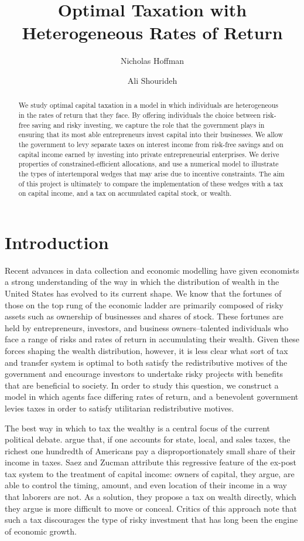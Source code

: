 \documentclass[11pt]{article}
\title{Optimal Taxation with Heterogeneous Rates of Return}
\author{
    Nicholas Hoffman\\
    \and 
    Ali Shourideh\\
}
\begin{document}
\maketitle
\begin{abstract}
    We study optimal capital taxation in a model in which individuals are heterogeneous in the rates of return that they face. By offering individuals the choice between risk-free saving and risky investing, we capture the role that the government plays in ensuring that its most able entrepreneurs invest capital into their businesses. We allow the government to levy separate taxes on interest income from risk-free savings and on capital income earned by investing into private entrepreneurial enterprises. We derive properties of constrained-efficient allocations, and use a numerical model to illustrate the types of intertemporal wedges that may arise due to incentive constraints. The aim of this project is ultimately to compare the implementation of these wedges with a tax on capital income, and a tax on accumulated capital stock, or wealth. 
\end{abstract}

\section{Introduction} \label{intro}

Recent advances in data collection and economic modelling have given economists a strong understanding of the way in which the distribution of wealth in the United States has evolved to its current shape. We know that the fortunes of those on the top rung of the economic ladder are primarily composed of risky assets such as ownership of businesses and shares of stock. These fortunes are held by entrepreneurs, investors, and business owners--talented individuals who face a range of risks and rates of return in accumulating their wealth. Given these forces shaping the wealth distribution, however, it is less clear what sort of tax and transfer system is optimal to both satisfy the redistributive motives of the government and encourage investors to undertake risky projects with benefits that are beneficial to society. In order to study this question, we construct a model in which agents face differing rates of return, and a benevolent government levies taxes in order to satisfy utilitarian redistributive motives. 

The best way in which to tax the wealthy is a central focus of the current political debate. \cite{saez2019triumph} argue that, if one accounts for state, local, and sales taxes, the richest one hundredth of Americans pay a disproportionately small share of their income in taxes. Saez and Zucman attribute this regressive feature of the ex-post tax system to the treatment of capital income: owners of capital, they argue, are able to control the timing, amount, and even location of their income in a way that laborers are not. As a solution, they propose a tax on wealth directly, which they argue is more difficult to move or conceal. Critics of this approach note that such a tax discourages the type of risky investment that has long been the engine of economic growth. 
\end{document}
